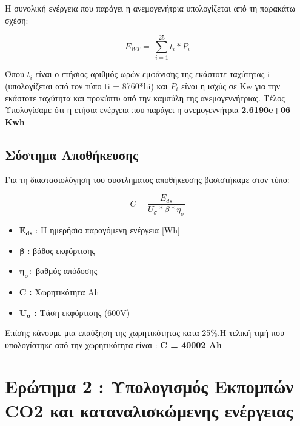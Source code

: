 \documentclass[]{article}
\begin{document}
Η συνολική ενέργεια που παράγει η ανεμογενήτρια υπολογίζεται από τη παρακάτω σχέση:

\[E_{WT} = \ \sum_{i = 1}^{25}{t_{i}*P_{i}}\]

Όπου \(t_{i}\) είναι ο ετήσιος αριθμός ωρών εμφάνισης της εκάστοτε ταχύτητας i (υπολογίζεται από τον τύπο ti = 8760*hi) και \(P_{i}\) είναι η ισχύς σε Kw για την εκάστοτε ταχύτητα και προκύπτυ από την καμπύλη της ανεμογεννήτριας. Τέλος Υπολογίσαμε ότι η ετήσια ενέργεια που παράγει η ανεμογεννήτρια \textbf{2.6190e+06 Kwh}

\hypertarget{σύστημα-αποθήκευσης}{%
\subsection{Σύστημα Αποθήκευσης}\label{σύστημα-αποθήκευσης}}

Για τη διαστασιολόγηση του συστληματος αποθήκευσης βασιστήκαμε στον τύπο:

\[C = \frac{E_{ds}}{U_{\sigma}*\beta*\eta_{\sigma}}\]

\begin{itemize}
\item \(\mathbf{E}_{\mathbf{ds}}\) : H ημερήσια παραγόμενη ενέργεια {[}Wh{]}
\item \(\mathbf{\beta}\) : βάθος εκφόρτισης
\item \(\mathbf{\eta}_{\mathbf{\sigma}}\mathbf{:}\) βαθμός απόδοσης
\item \(\mathbf{C}\) \textbf{:} Χωρητικότητα Ah
\item \(\mathbf{U}_{\mathbf{\sigma}}\) \textbf{:} Τάση εκφόρτισης (600V)
\end{itemize}

Επίσης κάνουμε μια επαύξηση της χωρητικότητας κατα 25\%.Η τελική τιμή που υπολογίστηκε από την χωρητικότητα είναι : \textbf{C = 40002 Ah}

\hypertarget{section}{%
\section{}\label{section}}

\hypertarget{ερώτημα-2-υπολογισμός-εκπομπών-co2-και-καταναλισκώμενης-ενέργειας}{%
\section{Ερώτημα 2 : Υπολογισμός Εκπομπών CO2 και καταναλισκώμενης ενέργειας}\label{ερώτημα-2-υπολογισμός-εκπομπών-co2-και-καταναλισκώμενης-ενέργειας}}
\end{document}
